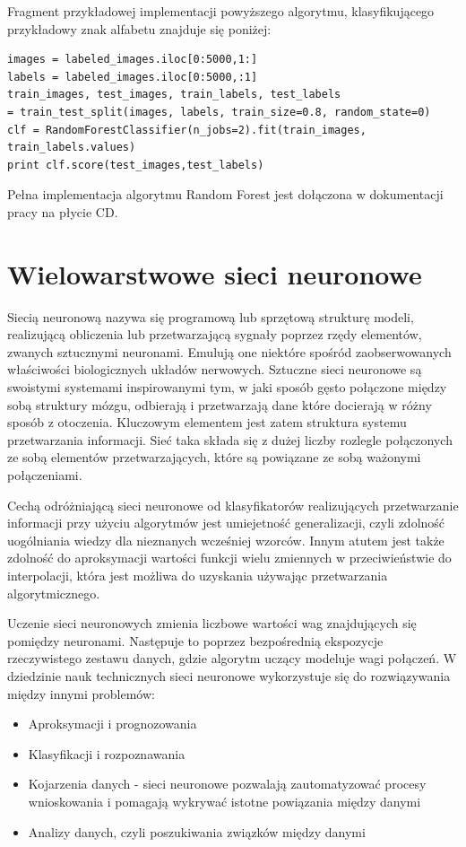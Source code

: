 \documentclass[brudnopis]{xmgr}
\begin{document}
Fragment przykładowej implementacji powyższego algorytmu, klasyfikującego przykładowy znak alfabetu znajduje się poniżej:

\begin{verbatim}
images = labeled_images.iloc[0:5000,1:]
labels = labeled_images.iloc[0:5000,:1]
train_images, test_images, train_labels, test_labels 
= train_test_split(images, labels, train_size=0.8, random_state=0)
clf = RandomForestClassifier(n_jobs=2).fit(train_images, train_labels.values)
print clf.score(test_images,test_labels)
\end{verbatim}

Pełna implementacja algorytmu Random Forest jest dołączona w dokumentacji pracy na płycie CD. 

\section{Wielowarstwowe sieci neuronowe}

Siecią neuronową\cite{1}\cite{12} nazywa się programową lub sprzętową strukturę modeli, realizującą obliczenia lub przetwarzającą sygnały poprzez rzędy elementów, zwanych sztucznymi neuronami. Emulują one niektóre spośród zaobserwowanych właściwości biologicznych układów nerwowych. Sztuczne sieci neuronowe są swoistymi systemami inspirowanymi tym, w jaki sposób gęsto połączone między sobą struktury mózgu, odbierają i przetwarzają dane które docierają w różny sposób z otoczenia. Kluczowym elementem jest zatem struktura systemu przetwarzania informacji. Sieć taka składa się z dużej liczby rozlegle połączonych ze sobą elementów przetwarzających, które są powiązane ze sobą ważonymi połączeniami.

Cechą odróżniającą sieci neuronowe od klasyfikatorów realizujących przetwarzanie informacji przy użyciu algorytmów jest umiejetność generalizacji, czyli zdolność uogólniania wiedzy dla nieznanych wcześniej wzorców. Innym atutem jest także zdolność do aproksymacji wartości funkcji wielu zmiennych w przeciwieństwie do interpolacji, która jest możliwa do uzyskania używając przetwarzania algorytmicznego.

Uczenie sieci neuronowych zmienia liczbowe wartości wag znajdujących się pomiędzy neuronami. Następuje to poprzez bezpośrednią ekspozycje rzeczywistego zestawu danych, gdzie algorytm uczący modeluje wagi połączeń. W dziedzinie nauk technicznych sieci neuronowe wykorzystuje się do rozwiązywania między innymi problemów:

\begin{itemize}
\item
Aproksymacji i prognozowania
\item
Klasyfikacji i rozpoznawania
\item
Kojarzenia danych - sieci neuronowe pozwalają zautomatyzować procesy wnioskowania i pomagają wykrywać istotne powiązania między danymi
\item
Analizy danych, czyli poszukiwania związków między danymi
\end{itemize}
\end{document}
